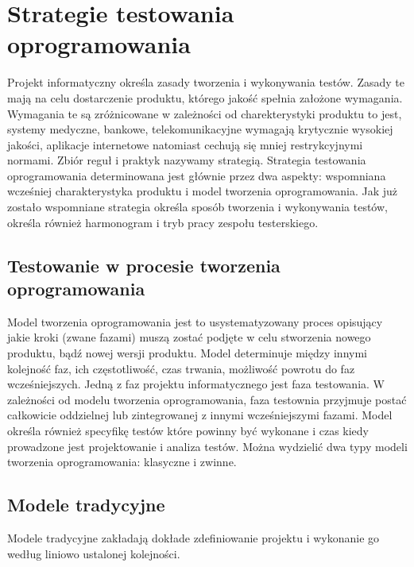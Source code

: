 \chapter{Strategie testowania oprogramowania}
Projekt informatyczny określa zasady tworzenia i wykonywania testów. Zasady te mają na celu dostarczenie produktu, którego jakość spełnia założone wymagania. Wymagania te są zróżnicowane w zależności od charekterystyki produktu to jest, systemy medyczne, bankowe, telekomunikacyjne wymagają krytycznie wysokiej jakości, aplikacje internetowe natomiast cechują się mniej restrykcyjnymi normami. Zbiór reguł i praktyk nazywamy strategią. Strategia testowania oprogramowania determinowana jest głównie przez dwa aspekty: wspomniana wcześniej charakterystyka produktu i model tworzenia oprogramowania. 
Jak już zostało wspomniane strategia określa sposób tworzenia i wykonywania testów, określa również harmonogram i tryb pracy zespołu testerskiego.

\label{cha:strategie testowania}
\section{Testowanie w procesie tworzenia oprogramowania}
\label{sec:testowanieWprocesie}
Model tworzenia oprogramowania jest to usystematyzowany proces opisujący jakie kroki (zwane fazami) muszą zostać podjęte w celu stworzenia nowego produktu, bądź nowej wersji produktu. Model determinuje między innymi kolejność faz, ich częstotliwość, czas trwania, możliwość powrotu do faz wcześniejszych. Jedną z faz projektu informatycznego jest faza testowania. W zależności od modelu tworzenia oprogramowania, faza testownia przyjmuje postać całkowicie oddzielnej lub zintegrowanej z innymi wcześniejszymi fazami. Model określa również specyfikę testów które powinny być wykonane  i czas kiedy prowadzone jest projektowanie i analiza testów.
Można wydzielić dwa typy modeli tworzenia oprogramowania: klasyczne i zwinne.  
\section{Modele tradycyjne}
Modele tradycyjne zakładają dokłade zdefiniowanie projektu i wykonanie go według liniowo ustalonej kolejności.
